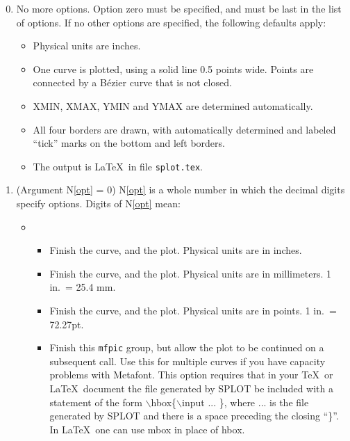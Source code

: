 \documentclass[twoside]{MATH77}
\begin{document}
\begin{multicols}{2}
\vspace{-5pt}
\renewcommand{\labelenumi}{\bf \theenumi}
\begin{enumerate}
\setcounter{enumi}{-1}
\item   No more options.  Option zero must be specified, and must be last
        in the list of options. If no other options are specified, the
        following defaults apply:
  \begin{itemize}
  \item Physical units are inches.
  \item One curve is plotted, using a solid line 0.5 points wide.
          Points are connected by a B\'ezier curve that is not closed.
  \item XMIN, XMAX, YMIN and YMAX are determined automatically.
  \item All four borders are drawn, with automatically determined and
          labeled ``tick'' marks on the bottom and left borders.
  \item The output is \LaTeX\ in file {\tt splot.tex}.
  \end{itemize}
\item\label{opt}  (Argument N\ref{opt} = 0) N\ref{opt} is a whole number
        in which the decimal digits specify options.  Digits of
        N\ref{opt} mean:
  \begin{itemize}
  \item[$10^0$]
   \begin{itemize}
   \item[0 =] Finish the curve, and the plot. Physical units are in
          inches.
   \item[1 =] Finish the curve, and the plot. Physical units are in
          millimeters.  1 in.\ = 25.4 mm.
   \item[2 =] Finish the curve, and the plot. Physical units are in
          points.  1 in.\ = 72.27pt.
   \item[3 =] Finish this {\tt mfpic} group, but allow the plot to be
          continued on a subsequent call.  Use this for multiple curves if
          you have capacity problems with Metafont.  This option requires
          that in your \TeX \ or \LaTeX \ document the file generated by
          SPLOT be included with a statement of the form
          $\backslash$hbox\{$\backslash$input ... \}, where ... is the
          file generated by SPLOT and there is a space preceding the
          closing ``\}''. In \LaTeX \ one can use mbox in place of hbox.

\end{itemize}
\end{itemize}
\end{enumerate}
\end{multicols}
\end{document}
